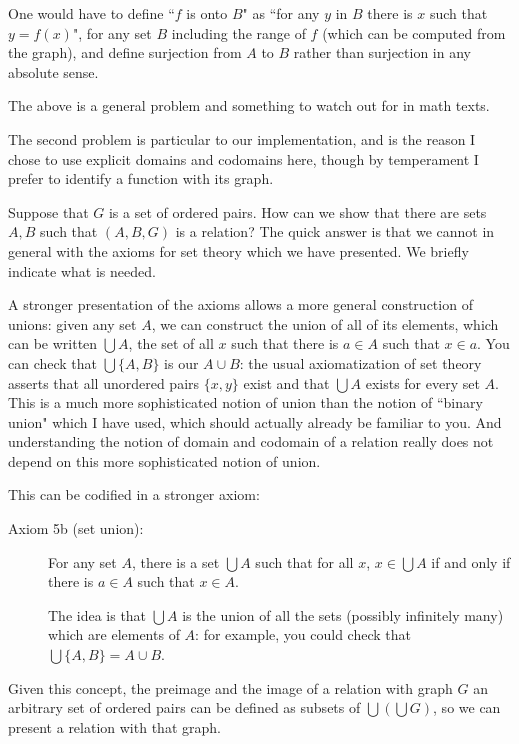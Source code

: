 \documentclass[12pt]{article}
\begin{document}
\begin{description}
One would have to define ``$f$ is onto $B$" as ``for any $y$ in $B$ there is $x$ such that $y=f(x)$", for any set
$B$ including the range of $f$ (which can be computed from the graph), and define surjection from $A$ to $B$ rather than surjection in any absolute sense.

The above is a general problem and something to watch out for in math texts.

The second problem is particular to our implementation, and is the reason I chose to use explicit domains and codomains here, though by temperament I prefer to identify a function with its graph.

Suppose that $G$ is a set of ordered pairs.  How can we show that there are sets $A,B$ such that $(A,B,G)$ is a relation?
The quick answer is that we cannot in general with the axioms for set theory which we have presented.  We briefly indicate what is needed.

A stronger presentation of the axioms allows a more general construction of unions:  given any set $A$, we can construct the union of all of its elements, which can be written $\bigcup A$, the set of all $x$ such that there is $a \in A$ such
that $x \in a$.  You can check that $\bigcup \{A,B\}$ is our $A \cup B$:  the usual axiomatization of set theory 
asserts that all unordered pairs $\{x,y\}$ exist and that $\bigcup A$ exists for every set $A$.  This is a much more sophisticated notion of union than the notion of ``binary union" which I have used, which should actually already be familiar to you.  And understanding the notion of domain and codomain of a relation really does not depend on this more sophisticated notion of union.

This can be codified in a stronger axiom:

\begin{description}

\item[Axiom 5b (set union):]  For any set $A$, there is a set $\bigcup A$ such that for all $x$, $x \in \bigcup A$ if and only if there is $a \in A$ such that $x \in A$.  

The idea is that $\bigcup A$ is the union of all the sets (possibly infinitely many) which are elements of $A$: for example, you could check that $\bigcup \{A,B\} = A \cup B$.

\end{description}

Given this concept, the preimage and the image of a relation with graph $G$ an arbitrary set of ordered pairs can be defined as subsets of $\bigcup(\bigcup G)$, so we can present a relation with that graph.  


\end{description}
\end{document}
